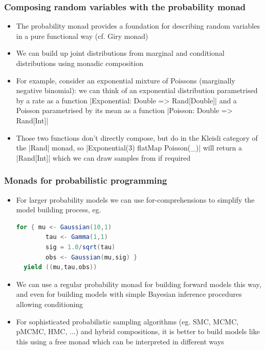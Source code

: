 \documentclass[mathserif,handout]{beamer}
\begin{document}
\begin{frame}[fragile]
  \frametitle{Composing random variables with the probability monad}
  \begin{itemize}
  \item The \alert{probability monad} provides a foundation for describing random variables in a pure functional way (cf. \alert{Giry monad})
  \item We can build up joint distributions from marginal and conditional distributions using \alert{monadic composition}
  \item For example, consider an exponential mixture of Poissons (marginally negative binomial): we can think of an exponential distribution parametrised by a rate as a function |Exponential: Double => Rand[Double]| and a Poisson parametrised by its mean as a function |Poisson: Double => Rand[Int]|
    \item Those two functions don't directly compose, but do in the Kleisli category of the |Rand| monad, so |Exponential(3) flatMap {Poisson(_)}| will return a |Rand[Int]| which we can draw samples from if required
  \end{itemize}
\end{frame}


\begin{frame}[fragile]
  \frametitle{Monads for probabilistic programming}
  \begin{itemize}
    \item For larger probability models we can use \alert{for-comprehensions} to simplify the model building process, eg.
\begin{lstlisting}[language=scala]
  for { mu <- Gaussian(10,1)
        tau <- Gamma(1,1)
        sig = 1.0/sqrt(tau)
        obs <- Gaussian(mu,sig) }
  yield ((mu,tau,obs))
\end{lstlisting}
  \item We can use a regular probability monad for building forward models this way, and even for building models with simple Bayesian inference procedures allowing conditioning
    \item For sophisticated probabilistic sampling algorithms (eg. SMC, MCMC, pMCMC, HMC, ...) and hybrid compositions, it is better to build models like this using a \alert{free monad} which can be \alert{interpreted} in different ways
  \end{itemize}
\end{frame}
\end{document}

